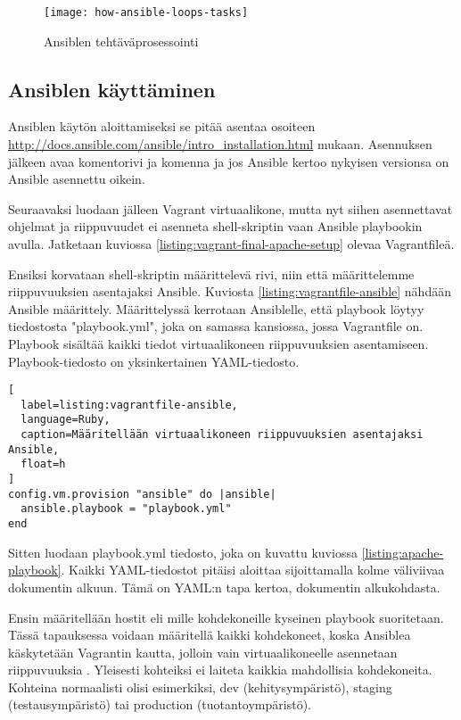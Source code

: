 \begin{figure}[h]
  \centering
  \texttt{[image: how-ansible-loops-tasks]}
  \caption{Ansiblen tehtäväprosessointi}
  \label{fig:how-ansible-loops-tasks}
\end{figure}

\subsection{Ansiblen käyttäminen}

Ansiblen käytön aloittamiseksi se pitää asentaa osoiteen \url{http://docs.ansible.com/ansible/intro_installation.html} mukaan. Asennuksen jälkeen avaa komentorivi ja komenna  ja jos Ansible kertoo nykyisen versionsa on Ansible asennettu oikein.

Seuraavaksi luodaan jälleen Vagrant virtuaalikone, mutta nyt siihen asennettavat ohjelmat ja riippuvuudet ei asenneta shell-skriptin vaan Ansible playbookin avulla. Jatketaan kuviossa \ref{listing:vagrant-final-apache-setup} olevaa Vagrantfileä.

Ensiksi korvataan shell-skriptin määrittelevä rivi, niin että määrittelemme riippuvuuksien asentajaksi Ansible. Kuviosta \ref{listing:vagrantfile-ansible} nähdään Ansible määrittely. Määrittelyssä kerrotaan Ansiblelle, että playbook löytyy tiedostosta "playbook.yml", joka on samassa kansiossa, jossa Vagrantfile on. Playbook sisältää kaikki tiedot virtuaalikoneen riippuvuuksien asentamiseen. Playbook-tiedosto on yksinkertainen YAML-tiedosto.

\begin{lstlisting}[
  label=listing:vagrantfile-ansible,
  language=Ruby,
  caption=Määritellään virtuaalikoneen riippuvuuksien asentajaksi Ansible,
  float=h
]
config.vm.provision "ansible" do |ansible|
  ansible.playbook = "playbook.yml"
end
\end{lstlisting}

Sitten luodaan playbook.yml tiedosto, joka on kuvattu kuviossa \ref{listing:apache-playbook}. Kaikki YAML-tiedostot pitäisi aloittaa sijoittamalla kolme väliviivaa dokumentin alkuun. Tämä on YAML:n tapa kertoa, dokumentin alkukohdasta.

Ensin määritellään hostit eli mille kohdekoneille kyseinen playbook suoritetaan. Tässä tapauksessa voidaan määritellä kaikki kohdekoneet, koska Ansiblea käskytetään Vagrantin kautta, jolloin vain virtuaalikoneelle asennetaan riippuvuuksia \cite{link:comprehensive-ansible-tutorial}. Yleisesti kohteiksi ei laiteta kaikkia mahdollisia kohdekoneita. Kohteina normaalisti olisi esimerkiksi, dev (kehitysympäristö), staging (testausympäristö) tai production (tuotantoympäristö).

